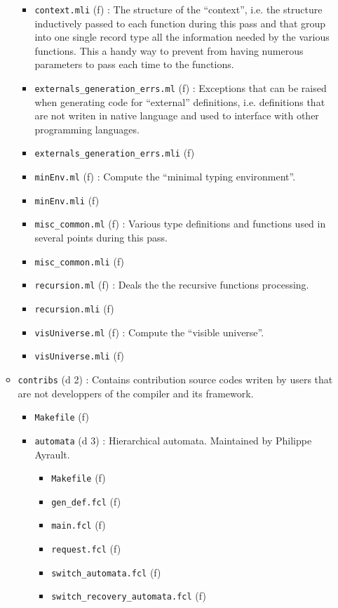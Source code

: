 \begin{itemize}
\begin{itemize}
\begin{itemize}
    \item {\tt context.mli} (f) : The structure of the ``context'',
      i.e. the structure inductively passed to each function during
      this pass and that group into one single record type all the
      information needed by the various functions. This a handy way to
      prevent from having numerous parameters to pass each time to the
      functions.
    \item {\tt externals\_generation\_errs.ml} (f) : Exceptions that
      can be raised when generating code for ``external'' definitions,
      i.e. definitions that are not writen in native \focalize
      language and used to interface with other programming languages.
    \item {\tt externals\_generation\_errs.mli} (f)
    \item {\tt minEnv.ml} (f) : Compute the ``\coq minimal typing
      environment''.
    \item {\tt minEnv.mli} (f)
    \item {\tt misc\_common.ml} (f) : Various type definitions and
      functions used in several points during this pass.
    \item {\tt misc\_common.mli} (f)
    \item {\tt recursion.ml} (f) : Deals the the recursive
      functions processing.
    \item {\tt recursion.mli} (f)
    \item {\tt visUniverse.ml} (f) : Compute the ``visible
      universe''.
    \item {\tt visUniverse.mli} (f)
    \end{itemize}
  \item {\tt contribs} (d 2) : Contains contribution source codes writen
    by users that are not developpers of the compiler and its framework.
    \begin{itemize}
    \item {\tt Makefile} (f)
    \item {\tt automata} (d 3) : Hierarchical automata. Maintained by
      Philippe Ayrault.
      \begin{itemize}
      \item {\tt Makefile} (f)
      \item {\tt gen\_def.fcl} (f)
      \item {\tt main.fcl} (f)
      \item {\tt request.fcl} (f)
      \item {\tt switch\_automata.fcl} (f)
      \item {\tt switch\_recovery\_automata.fcl} (f)

\end{itemize}
\end{itemize}
\end{itemize}
\end{itemize}
